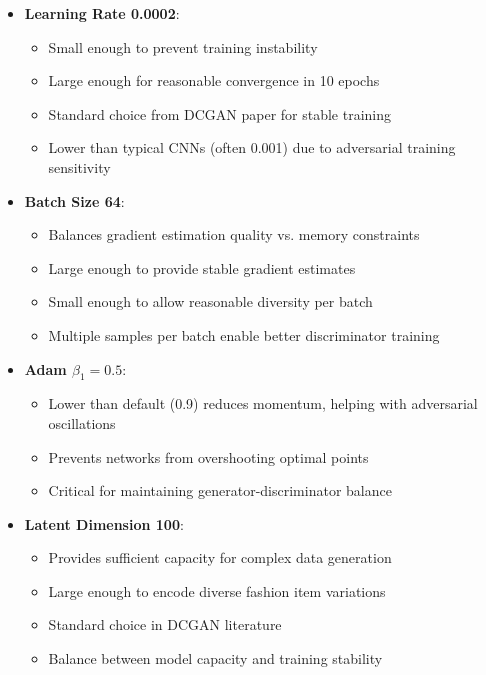 \documentclass[conference,12pt]{IEEEtran}
\begin{document}
\begin{itemize}
    \item \textbf{Learning Rate 0.0002}: 
    \begin{itemize}
        \item Small enough to prevent training instability
        \item Large enough for reasonable convergence in 10 epochs
        \item Standard choice from DCGAN paper for stable training
        \item Lower than typical CNNs (often 0.001) due to adversarial training sensitivity
    \end{itemize}
    
    \item \textbf{Batch Size 64}:
    \begin{itemize}
        \item Balances gradient estimation quality vs. memory constraints
        \item Large enough to provide stable gradient estimates
        \item Small enough to allow reasonable diversity per batch
        \item Multiple samples per batch enable better discriminator training
    \end{itemize}
    
    \item \textbf{Adam $\beta_1 = 0.5$}:
    \begin{itemize}
        \item Lower than default (0.9) reduces momentum, helping with adversarial oscillations
        \item Prevents networks from overshooting optimal points
        \item Critical for maintaining generator-discriminator balance
    \end{itemize}
    
    \item \textbf{Latent Dimension 100}:
    \begin{itemize}
        \item Provides sufficient capacity for complex data generation
        \item Large enough to encode diverse fashion item variations
        \item Standard choice in DCGAN literature
        \item Balance between model capacity and training stability
    \end{itemize}
\end{itemize}
\end{document}
